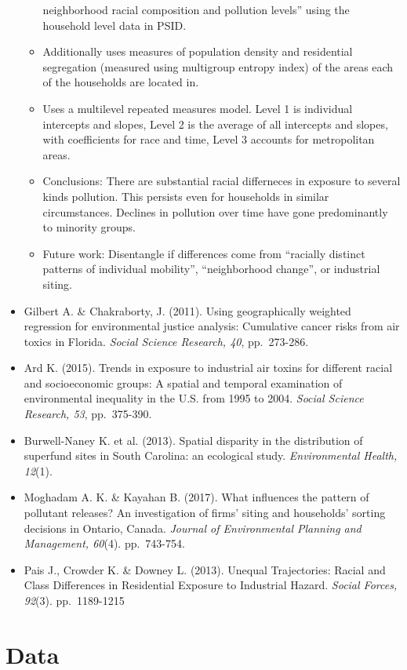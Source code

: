 \documentclass[12pt,twoside]{dukestatscithesis}
\theoremstyle{definition}
\theoremstyle{definition}
\theoremstyle{definition}
\theoremstyle{remark}
\begin{document}
\begin{itemize}
\begin{itemize}
    neighborhood racial composition and pollution levels'' using the
    household level data in PSID.
  \item
    Additionally uses measures of population density and residential
    segregation (measured using multigroup entropy index) of the areas
    each of the households are located in.
  \item
    Uses a multilevel repeated measures model. Level 1 is individual
    intercepts and slopes, Level 2 is the average of all intercepts and
    slopes, with coefficients for race and time, Level 3 accounts for
    metropolitan areas.
  \item
    Conclusions: There are substantial racial differneces in exposure to
    several kinds pollution. This persists even for households in
    similar circumstances. Declines in pollution over time have gone
    predominantly to minority groups.
  \item
    Future work: Disentangle if differences come from ``racially
    distinct patterns of individual mobility'', ``neighborhood change'',
    or industrial siting.
  \end{itemize}
\item
  Gilbert A. \& Chakraborty, J. (2011). Using geographically weighted
  regression for environmental justice analysis: Cumulative cancer risks
  from air toxics in Florida. \emph{Social Science Research, 40},
  pp.~273-286.
\item
  Ard K. (2015). Trends in exposure to industrial air toxins for
  different racial and socioeconomic groups: A spatial and temporal
  examination of environmental inequality in the U.S. from 1995 to 2004.
  \emph{Social Science Research, 53}, pp.~375-390.
\item
  Burwell-Naney K. et al. (2013). Spatial disparity in the distribution
  of superfund sites in South Carolina: an ecological study.
  \emph{Environmental Health, 12}(1).
\item
  Moghadam A. K. \& Kayahan B. (2017). What influences the pattern of
  pollutant releases? An investigation of firms' siting and households'
  sorting decisions in Ontario, Canada. \emph{Journal of Environmental
  Planning and Management, 60}(4). pp.~743-754.
\item
  Pais J., Crowder K. \& Downey L. (2013). Unequal Trajectories: Racial
  and Class Differences in Residential Exposure to Industrial Hazard.
  \emph{Social Forces, 92}(3). pp.~1189-1215
\end{itemize}
\chapter{Data}\label{math}
\end{document}
